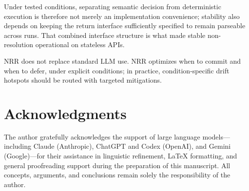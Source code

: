 \documentclass[11pt,a4paper]{article}
\begin{document}
Under tested conditions, separating semantic decision from deterministic
execution is therefore not merely an implementation convenience; stability also
depends on keeping the return interface sufficiently specified to remain
parseable across runs. That combined interface structure is what made stable
non-resolution operational on stateless APIs.

NRR does not replace standard LLM use. NRR optimizes when to commit and when to
defer, under explicit conditions; in practice, condition-specific drift hotspots
should be routed with targeted mitigations.

\section*{Acknowledgments}

The author gratefully acknowledges the support of large language 
models---including Claude (Anthropic), ChatGPT and Codex (OpenAI), and 
Gemini (Google)---for their assistance in linguistic refinement, 
LaTeX formatting, and general proofreading support during the 
preparation of this manuscript.
All concepts, arguments, and conclusions remain solely the 
responsibility of the author.
\end{document}
